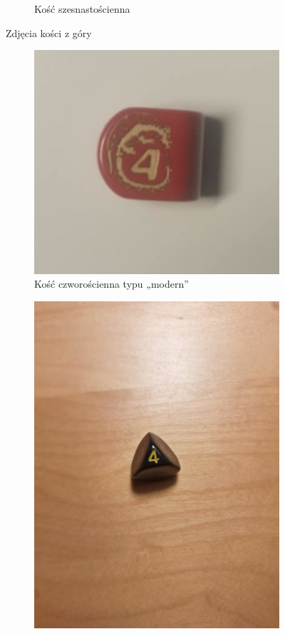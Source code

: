 \begin{figure}[h]
\begin{subfigure}{.3\textwidth}
        \caption{\label{fig:k16}Kość szesnastościenna}
      \end{subfigure}
    \caption{Zdjęcia kości z góry}
\end{figure}

\begin{figure}[h]
    \centering
      \begin{subfigure}{.43\textwidth}
        \includegraphics[width=.9\linewidth]{chapters/02-teoria/figures/modern_k4}
        \caption{\label{fig:modern_k4}Kość czworościenna typu „modern”}
      \end{subfigure}%
      \begin{subfigure}{.45\textwidth}
        \includegraphics[width=.9\linewidth, trim={250mm 200mm 350mm 150mm}, clip]{chapters/02-teoria/figures/nietypowe_k4}

\end{subfigure}
\end{figure}
